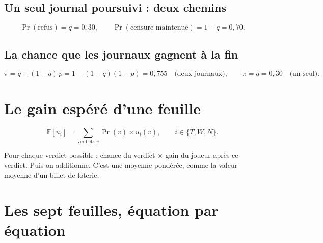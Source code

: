 \documentclass[11pt,a4paper]{article}
\theoremstyle{definition}
\newcommand{\E}{\mathbb{E}}
\begin{document}
\subsection{Un seul journal poursuivi : deux chemins}
\[
\Pr(\text{refus})=q=0,30,\qquad \Pr(\text{censure maintenue})=1-q=0,70 .
\]

\subsection{La chance que les journaux gagnent à la fin}
\begin{equation}
\pi=q+(1-q)\,p=1-(1-q)(1-p)=0,755 \quad\text{(deux journaux)},\qquad \pi=q=0,30\quad\text{(un seul).}\label{eq:pi}
\end{equation}

\section{Le gain espéré d'une feuille}
\begin{equation}
\E[u_i]=\sum_{\text{verdicts } v}\Pr(v)\times u_i(v),\qquad i\in\{T,W,N\}. \label{eq:esp}
\end{equation}
\begin{simple}
Pour chaque verdict possible : chance du verdict $\times$ gain du joueur après ce verdict. Puis on additionne. C'est une moyenne pondérée, comme la valeur moyenne d'un billet de loterie.
\end{simple}

\section{Les sept feuilles, équation par équation}
\end{document}
